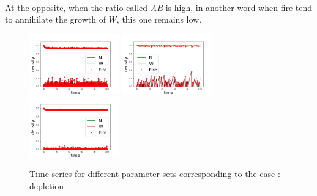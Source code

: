 \documentclass{article}
\begin{document}
\paragraph{}
At the opposite, when the ratio called \textit{AB} is high, in another word when fire tend to annihilate the growth of $W$, this one remains low.
\begin{figure}[h!]
\centering
\includegraphics[width=3.9cm]{continue_1.png}
\includegraphics[width=3.9cm]{continue_2.png}
\includegraphics[width=3.9cm]{continue_3.png}
\caption{Time series for different parameter sets corresponding to the case : depletion}
\end{figure}
\end{document}
